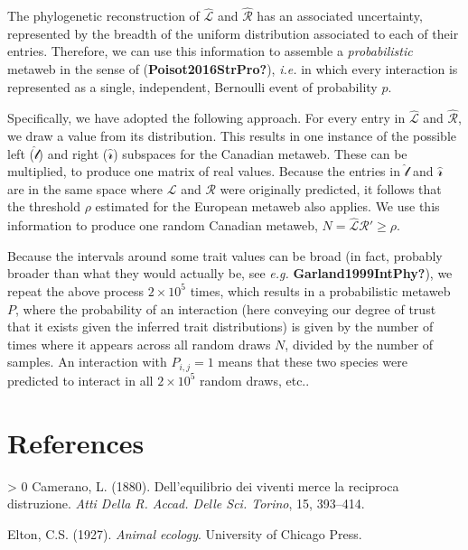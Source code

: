 \documentclass[10pt,oneside]{article}
\newlength{\cslhangindent}
\newenvironment{CSLReferences}[3] %
 {%
  \setlength{\parindent}{0pt}
  \ifodd #1 \everypar{\setlength{\hangindent}{\cslhangindent}}\ignorespaces\fi
  \ifnum #2 > 0
  \setlength{\parskip}{#2\baselineskip}
  \fi
 }%
 {}
\begin{document}
The phylogenetic reconstruction of \(\hat{\mathscr{L}}\) and
\(\hat{\mathscr{R}}\) has an associated uncertainty, represented by the
breadth of the uniform distribution associated to each of their entries.
Therefore, we can use this information to assemble a
\emph{probabilistic} metaweb in the sense of
(\textbf{Poisot2016StrPro?}), \emph{i.e.} in which every interaction is
represented as a single, independent, Bernoulli event of probability
\(p\).

Specifically, we have adopted the following approach. For every entry in
\(\hat{\mathscr{L}}\) and \(\hat{\mathscr{R}}\), we draw a value from
its distribution. This results in one instance of the possible left
(\(\hat{\mathscr{l}}\)) and right (\(\hat{\mathscr{r}}\)) subspaces for
the Canadian metaweb. These can be multiplied, to produce one matrix of
real values. Because the entries in \(\hat{\mathscr{l}}\) and
\(\hat{\mathscr{r}}\) are in the same space where \(\mathscr{L}\) and
\(\mathscr{R}\) were originally predicted, it follows that the threshold
\(\rho\) estimated for the European metaweb also applies. We use this
information to produce one random Canadian metaweb,
\(N = \hat{\mathscr{L}}\)\(\hat{\mathscr{R}}' \ge \rho\).

Because the intervals around some trait values can be broad (in fact,
probably broader than what they would actually be, see \emph{e.g.}
\textbf{Garland1999IntPhy?}), we repeat the above process
\(2\times 10^5\) times, which results in a probabilistic metaweb \(P\),
where the probability of an interaction (here conveying our degree of
trust that it exists given the inferred trait distributions) is given by
the number of times where it appears across all random draws \(N\),
divided by the number of samples. An interaction with \(P_{i,j} = 1\)
means that these two species were predicted to interact in all
\(2\times 10^5\) random draws, etc..

\hypertarget{references}{%
\section*{References}\label{references}}

\hypertarget{refs}{}
\begin{CSLReferences}{1}{0}
\leavevmode\hypertarget{ref-Camerano1880EquViv}{}%
Camerano, L. (1880). Dell'equilibrio dei viventi merce la reciproca
distruzione. \emph{Atti Della R. Accad. Delle Sci. Torino}, 15,
393--414.

\leavevmode\hypertarget{ref-Elton1927AniEco}{}%
Elton, C.S. (1927). \emph{Animal ecology}. University of Chicago Press.

\end{CSLReferences}
\end{document}
